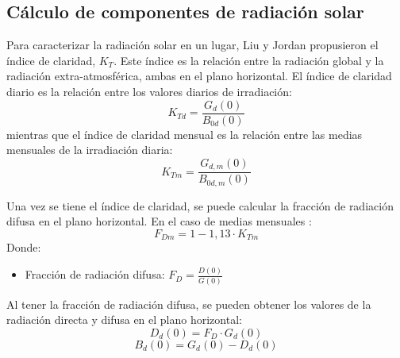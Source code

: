 \subsection{Cálculo de componentes de radiación solar}
\label{sec:orgefb7439}
\label{subsec:calculo-componentes-radiacion-solar}
Para caracterizar la radiación solar en un lugar, Liu y Jordan \cite{Liu.Jordan1960} propusieron el índice de claridad, \(K_T\). Este índice es la relación entre la radiación global y la radiación extra-atmosférica, ambas en el plano horizontal. El índice de claridad diario es la relación entre los valores diarios de irradiación: 
\begin{equation}
K_{Td}=\frac{G_d(0)}{B_{0d}(0)}
\label{eq:ind-cla-dia}
\end{equation}
mientras que el índice de claridad mensual es la relación entre las medias mensuales de la irradiación diaria:
\begin{equation}
K_{Tm}=\frac{G_{d,m}(0)}{B_{0d,m}(0)}
\label{eq:ind-cla-men}
\end{equation}

Una vez se tiene el índice de claridad, se puede calcular la fracción de radiación difusa en el plano horizontal. En el caso de medias mensuales \cite{Page1961}:
\begin{equation}
F_{Dm}=1-1,13\cdot K_{Tm}
\end{equation}
Donde:
\begin{itemize}
\item Fracción de radiación difusa: \(F_D=\frac{D(0)}{G(0)}\) 
 
\end{itemize}
Al tener la fracción de radiación difusa, se pueden obtener los valores de la radiación directa y difusa en el plano horizontal:
\begin{equation}
D_d(0)=F_D\cdot G_d(0)
\label{dif-rad}
\end{equation}
\begin{equation}
B_d(0)=G_d(0)-D_d(0)
\label{dir-rad}
\end{equation}

